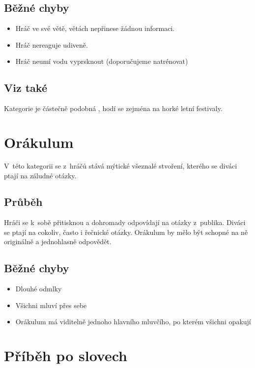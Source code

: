 \subsection{Běžné chyby} \begin{itemize}
\item Hráč ve své větě, větách nepřinese žádnou informaci.
\item Hráč nereaguje udiveně.
\item Hráč neumí vodu vyprsknout (doporučujeme natrénovat)
\end{itemize}
 
\subsection{Viz také} Kategorie je částečně podobná , hodí se zejména na horké letní festivaly. 
 
 
 
\needspace{5cm} \section{Orákulum} \label{orákulum}  
 
V~této kategorii se z~hráčů stává mýtické všeznalé stvoření, kterého se diváci ptají na záludné otázky. 
 
\subsection{ Průběh } Hráči se k~sobě přitisknou a dohromady odpovídají na otázky z~publika. Diváci se ptají na cokoliv, často i řečnické otázky. Orákulum by mělo být schopné na ně originálně a jednohlasně odpovědět. 
 
\subsection{ Běžné chyby } \begin{itemize}
\item Dlouhé odmlky
\item Všichni mluví přes sebe
\item Orákulum má viditelně jednoho hlavního mluvčího, po kterém všichni opakují
\end{itemize}
 
 
 
 
\needspace{5cm} \section{Příběh po slovech} \label{příběh po slovech}  
 
